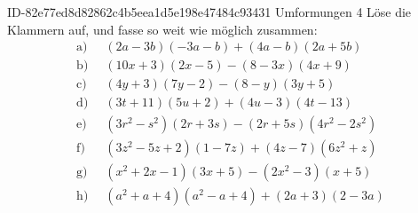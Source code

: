 \begin{exercise}
      {ID-82e77ed8d82862c4b5eea1d5e198e47484c93431}
      {Umformungen 4}
  \ifproblem\problem
    \newcommand{\gap}{\;\;}%
    Löse die Klammern auf, und fasse so weit wie möglich zusammen:
    \begin{equation*}
      \begin{split}
        \text{a)}\gap & (2a-3b)(-3a-b)+(4a-b)(2a+5b) \\
        \text{b)}\gap & (10x+3)(2x-5)-(8-3x)(4x+9) \\
        \text{c)}\gap & (4y+3)(7y-2)-(8-y)(3y+5) \\
        \text{d)}\gap & (3t+11)(5u+2)+(4u-3)(4t-13) \\
        \text{e)}\gap & (3r^2-s^2)(2r+3s)-(2r+5s)(4r^2-2s^2) \\
        \text{f)}\gap & (3z^2-5z+2)(1-7z)+(4z-7)(6z^2+z) \\
        \text{g)}\gap & (x^2+2x-1)(3x+5)-(2x^2-3)(x+5) \\
        \text{h)}\gap & (a^2+a+4)(a^2-a+4)+(2a+3)(2-3a)
      \end{split}
    \end{equation*}
  \fi
  \ifoutcome\outcome
    \newcommand{\toprow}[2][20em]
    {%
      \makebox[#1][l]
      {%
        \ensuremath
        {%
          \displaystyle
          \phantom{\,=\:\,}%
          #2%
        }%
      }%
    }%
    \newcommand{\solutionA}[1]
    {%
      \begin{equation*}
        \begin{split}
          \text{a)} &\toprow[#1]{(2a-3b)(-3a-b)+(4a-b)(2a+5b)}         \\
                    &=           -6a^2-2ab+9ab+3b^2+8a^2+20ab-2ab-5b^2 \\
                    &=           -6a^2+8a^2-2ab+9ab+20ab-2ab+3b^2-5b^2 \\
                    &=           2a^2+25ab+-2b^2
        \end{split}
      \end{equation*}
    }%
    \newcommand{\solutionB}[1]
    {%
      \begin{equation*}
        \begin{split}
          \text{b)} &\toprow[#1]{(10x+3)(2x-5)-(8-3x)(4x+9)}                   \\
                    &=           20x^2-50x+6x-15-\left[32x+72-12x^2-27x\right] \\

\end{split}
\end{equation*}}
\end{exercise}
